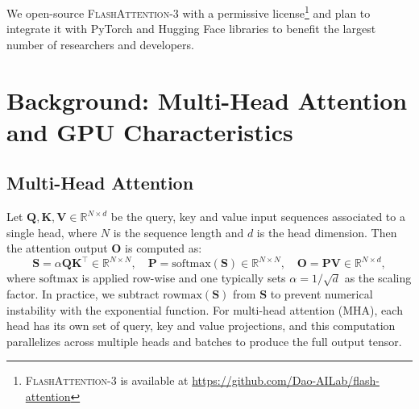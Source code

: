 \documentclass{article}
\newcommand{\softmax}{\mathrm{softmax}}
\newcommand{\rowmax}{\mathrm{rowmax}}
\newcommand{\vQ}{\mathbf{Q}}
\newcommand{\vK}{\mathbf{K}}
\newcommand{\vV}{\mathbf{V}}
\newcommand{\vS}{\mathbf{S}}
\newcommand{\vP}{\mathbf{P}}
\newcommand{\vO}{\mathbf{O}}
\newcommand{\fat}{\textsc{FlashAttention-3}\xspace}  %
\begin{document}
We open-source \fat with a permissive license\footnote{\fat
  is available at \url{https://github.com/Dao-AILab/flash-attention}} and plan
to integrate it with
PyTorch and Hugging Face libraries to benefit the largest number of researchers
and developers.



\section{Background: Multi-Head Attention and GPU Characteristics}
\label{sec:background}

\subsection{Multi-Head Attention}
\label{subsec:multi_head_attn}

Let $\vQ, \vK, \vV \in \mathbb{R}^{N \times d}$ be the query, key and value input sequences associated to a single head, where $N$ is the sequence length and $d$ is the head dimension. Then the attention output $\vO$ is computed as:
\begin{equation*}
  \vS = \alpha \vQ \vK^\top \in \mathbb{R}^{N \times N}, \quad \vP = \softmax(\vS) \in \mathbb{R}^{N \times N}, \quad \vO = \vP\vV \in \mathbb{R}^{N \times d},
\end{equation*}
where $\softmax$ is applied row-wise and one typically sets $\alpha = 1/\sqrt{d}$ as the scaling factor.
In practice, we subtract $\rowmax(\vS)$ from $\vS$ to prevent numerical instability with the exponential function.
For multi-head attention (MHA), each head has its own set of query, key and value projections, and this computation parallelizes across multiple heads and batches to produce the full output tensor.
\end{document}
